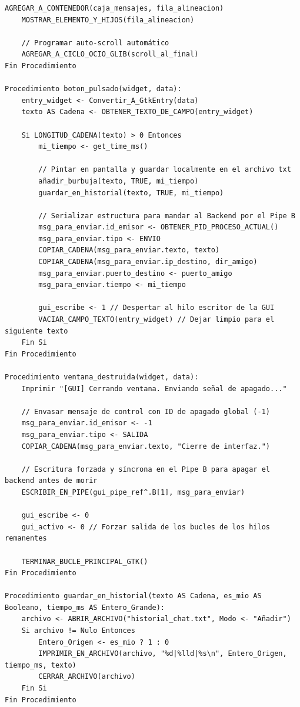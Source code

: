 \begin{lstlisting}[style=estiloPseudo]
    AGREGAR_A_CONTENEDOR(caja_mensajes, fila_alineacion)
    MOSTRAR_ELEMENTO_Y_HIJOS(fila_alineacion)

    // Programar auto-scroll automático
    AGREGAR_A_CICLO_OCIO_GLIB(scroll_al_final)
Fin Procedimiento

Procedimiento boton_pulsado(widget, data):
    entry_widget <- Convertir_A_GtkEntry(data)
    texto AS Cadena <- OBTENER_TEXTO_DE_CAMPO(entry_widget)

    Si LONGITUD_CADENA(texto) > 0 Entonces
        mi_tiempo <- get_time_ms()
        
        // Pintar en pantalla y guardar localmente en el archivo txt
        añadir_burbuja(texto, TRUE, mi_tiempo)
        guardar_en_historial(texto, TRUE, mi_tiempo)

        // Serializar estructura para mandar al Backend por el Pipe B
        msg_para_enviar.id_emisor <- OBTENER_PID_PROCESO_ACTUAL()
        msg_para_enviar.tipo <- ENVIO
        COPIAR_CADENA(msg_para_enviar.texto, texto)
        COPIAR_CADENA(msg_para_enviar.ip_destino, dir_amigo)
        msg_para_enviar.puerto_destino <- puerto_amigo
        msg_para_enviar.tiempo <- mi_tiempo

        gui_escribe <- 1 // Despertar al hilo escritor de la GUI
        VACIAR_CAMPO_TEXTO(entry_widget) // Dejar limpio para el siguiente texto
    Fin Si
Fin Procedimiento

Procedimiento ventana_destruida(widget, data):
    Imprimir "[GUI] Cerrando ventana. Enviando señal de apagado..."

    // Envasar mensaje de control con ID de apagado global (-1)
    msg_para_enviar.id_emisor <- -1
    msg_para_enviar.tipo <- SALIDA
    COPIAR_CADENA(msg_para_enviar.texto, "Cierre de interfaz.")
    
    // Escritura forzada y síncrona en el Pipe B para apagar el backend antes de morir
    ESCRIBIR_EN_PIPE(gui_pipe_ref^.B[1], msg_para_enviar)
    
    gui_escribe <- 0
    gui_activo <- 0 // Forzar salida de los bucles de los hilos remanentes
    
    TERMINAR_BUCLE_PRINCIPAL_GTK()
Fin Procedimiento

Procedimiento guardar_en_historial(texto AS Cadena, es_mio AS Booleano, tiempo_ms AS Entero_Grande):
    archivo <- ABRIR_ARCHIVO("historial_chat.txt", Modo <- "Añadir")
    Si archivo != Nulo Entonces
        Entero_Origen <- es_mio ? 1 : 0
        IMPRIMIR_EN_ARCHIVO(archivo, "%d|%lld|%s\n", Entero_Origen, tiempo_ms, texto)
        CERRAR_ARCHIVO(archivo)
    Fin Si
Fin Procedimiento



\end{lstlisting}
